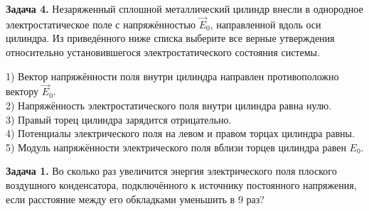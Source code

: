 \begin{taskbasic}[code={\label{task:elem_cap_v8_n14}}]
\textbf{Задача 4.} Незаряженный сплошной металлический цилиндр внесли в однородное электростатическое поле с напряжённостью $\vec{E}_0$, направленной вдоль оси цилиндра. Из приведённого ниже списка выберите все верные утверждения относительно установившегося электростатического состояния системы.

\nopagebreak\smallskip
\begin{center}
\end{center}

1) Вектор напряжённости поля внутри цилиндра направлен противоположно вектору $\vec{E}_0$.\\
2) Напряжённость электростатического поля внутри цилиндра равна нулю.\\
3) Правый торец цилиндра зарядится отрицательно.\\
4) Потенциалы электрического поля на левом и правом торцах цилиндра равны.\\
5) Модуль напряжённости электрического поля вблизи торцев цилиндра равен $E_0$.

\end{taskbasic}


\begin{taskbasic}[code={\label{task:elem_cap_v11_n11}}]
\textbf{Задача 1.} Во сколько раз увеличится энергия электрического поля плоского воздушного конденсатора, подключённого к источнику постоянного напряжения, если расстояние между его обкладками уменьшить в $9$ раз?

\end{taskbasic}

